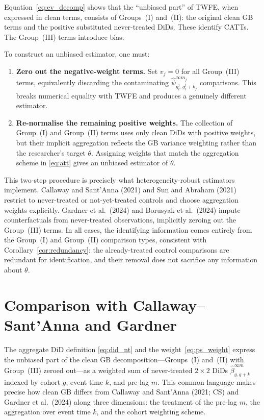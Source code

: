 \documentclass[12pt,letterpaper]{article}
\theoremstyle{remark}
\theoremstyle{definition}
\newcommand{\hbeta}{\hat{\beta}}
\newcommand{\hpsi}{\hat{\psi}}     %
\begin{document}
Equation~\eqref{eq:ev_decomp} shows that the ``unbiased part'' of TWFE, when
expressed in clean terms, consists of Groups~(I) and~(II): the original clean
GB terms and the positive substituted never-treated DiDs. These identify CATTs.
The Group~(III) terms introduce bias.

To construct an unbiased estimator, one must:
\begin{enumerate}
  \item \textbf{Zero out the negative-weight terms.} Set $v_j = 0$ for all
    Group~(III) terms, equivalently discarding the contaminating
    $\hpsi^{\infty m_j}_{g_e^j, g_l^j+k_j}$ comparisons. This breaks
    numerical equality with TWFE and produces a genuinely different estimator.
  \item \textbf{Re-normalise the remaining positive weights.} The collection of
    Group~(I) and Group~(II) terms uses only clean DiDs with positive weights,
    but their implicit aggregation reflects the GB variance weighting rather
    than the researcher's target $\theta$. Assigning weights that match the
    aggregation scheme in \eqref{eq:att} gives an unbiased estimator of
    $\theta$.
\end{enumerate}
This two-step procedure is precisely what heterogeneity-robust estimators
implement. Callaway and Sant'Anna (2021) and Sun and Abraham (2021) restrict
to never-treated or not-yet-treated controls and choose aggregation weights
explicitly. Gardner et al.\ (2024) and Borusyak et al.\ (2024) impute
counterfactuals from never-treated observations, implicitly zeroing out the
Group~(III) terms. In all cases, the identifying information comes entirely
from the Group~(I) and Group~(II) comparison types, consistent with
Corollary~\ref{cor:redundancy}: the already-treated control comparisons are
redundant for identification, and their removal does not sacrifice any
information about $\theta$.

\section{Comparison with Callaway--Sant'Anna and Gardner}
\label{sec:comparison}

The aggregate DiD definition \eqref{eq:did_nt} and the
weight~\eqref{eq:ps_weight} express the unbiased part of the clean GB
decomposition---Groups~(I) and~(II) with Group~(III) zeroed out---as a
weighted sum of never-treated $2\times2$ DiDs $\hbeta^{\infty m}_{g,g+k}$
indexed by cohort $g$, event time $k$, and pre-lag $m$. This common language
makes precise how clean GB differs from Callaway and Sant'Anna (2021; CS) and
Gardner et al.\ (2024) along three dimensions: the treatment of the pre-lag
$m$, the aggregation over event time $k$, and the cohort weighting scheme.
\end{document}
